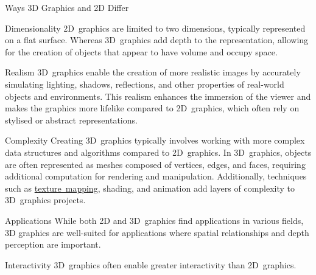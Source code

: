 \documentclass[../COS3712_Notes.tex]{subfiles}
\begin{document}
      \begin{sidenote}{Ways 3D Graphics and 2D Differ}
        $ $\vspace{-1em}
        \begin{descriptimize}
          \item[Dimensionality] 2D~graphics are limited to two dimensions,
            typically represented on a flat surface.
            Whereas 3D~graphics add depth to the representation, allowing for the creation
            of objects that appear to have volume and occupy space.
          \item[Realism] 3D~graphics enable the creation of more realistic images by accurately
            simulating lighting, shadows, reflections, and other properties of real-world objects
            and environments.
            This realism enhances the immersion of the viewer and makes the graphics more lifelike
            compared to 2D~graphics, which often rely on stylised or abstract representations.
          \item[Complexity] Creating 3D~graphics typically involves working with more complex
            data structures and algorithms compared to 2D~graphics.
            In 3D~graphics, objects are often represented as meshes composed of vertices,
            edges, and faces, requiring additional computation for rendering and manipulation.
            Additionally, techniques such as \hyperref[def:texture-mapping]{texture~mapping},
            shading, and animation add layers of complexity to 3D~graphics projects.
          \item[Applications] While both 2D and 3D~graphics find applications in various fields,
            3D graphics are well-suited for applications where spatial relationships and
            depth perception are important.
          \item[Interactivity] 3D~graphics often enable greater interactivity than 2D~graphics.
        \end{descriptimize}
      \end{sidenote}

\end{document}
